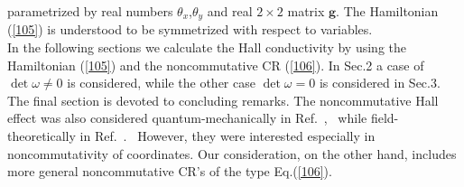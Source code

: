 \documentclass[a4paper,seceq]{ptptex}
\newcommand{\bfg}{ \boldsymbol{g} }
\begin{document}
parametrized by real numbers $\theta _x$,$\theta _y$ 
and real $2\times 2$  matrix $\bfg $.
The Hamiltonian (\ref{105}) is understood to be symmetrized
with respect to variables. \\
\indent
In the following sections we calculate the Hall conductivity
by using the Hamiltonian (\ref{105}) and
the noncommutative CR (\ref{106}).
In Sec.2 a case of $\det \omega \neq 0$ is considered,
while the other case  $\det \omega = 0$ is considered in Sec.3.
The final section is devoted to concluding remarks.
The noncommutative Hall effect was also considered
quantum-mechanically
in Ref.~, \ while field-theoretically
in Ref.~. \ However, they were interested especially
in noncommutativity of coordinates.
Our consideration, on the other hand,
includes more general noncommutative CR's of the type Eq.(\ref{106}).
\end{document}
